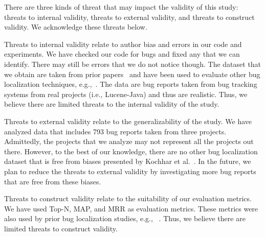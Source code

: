 



There are three kinds of threat that may impact the validity of this study: threats to internal validity, threats to external validity, and threats to construct validity. We acknowledge these threats below.

Threats to internal validity relate to author bias and errors in our code and experiments. We have checked our code for bugs and fixed any that we can identify. There may still be errors that we do not notice though. The dataset that we obtain are taken from prior papers~\cite{zhou2012should,KochharTL14} and have been used to evaluate other bug localization techniques, e.g.,~\cite{zhou2012should,SahaLKP14,huo2016learning}. The data are bug reports taken from bug tracking systems from real projects (i.e., Lucene-Java) and thus are realistic. Thus, we believe there are limited threats to the internal validity of the study. 

Threats to external validity relate to the generalizability of the study. We have analyzed data that includes 793 bug reports taken from three projects. Admittedly, the projects that we analyze may not represent all the projects out there. However, to the best of our knowledge, there are no other bug localization dataset that is free from biases presented by Kochhar et al.~\cite{KochharTL14}. In the future, we plan to reduce the threats to external validity by investigating more bug reports that are free from these biases. %

Threats to construct validity relate to the suitability of our evaluation metrics. We have used Top-N, MAP, and MRR as evaluation metrics. These metrics were also used by prior bug localization studies, e.g.,  ~\cite{zhou2012should,SahaLKP14,huo2016learning}. Thus, we believe there are limited threats to construct validity. 